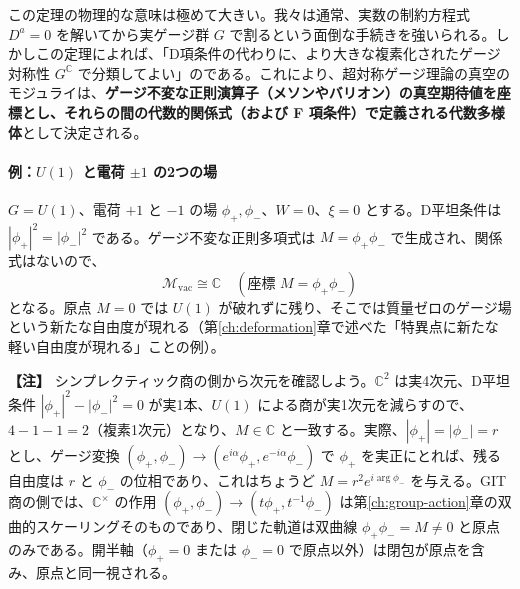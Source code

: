 \documentclass[uplatex, dvipdfmx, book]{jsbook}
\newenvironment{note}{\vspace{1ex}\par\footnotesize\noindent\textbf{【注】}}{\par\vspace{1ex}}
\begin{document}
この定理\cite{kempfness1979}の物理的な意味は極めて大きい。我々は通常、実数の制約方程式 $D^a=0$ を解いてから実ゲージ群 $G$ で割るという面倒な手続きを強いられる。しかしこの定理によれば、「D項条件の代わりに、より大きな複素化されたゲージ対称性 $G^\mathbb{C}$ で分類してよい」のである。これにより、超対称ゲージ理論の真空のモジュライは、\textbf{ゲージ不変な正則演算子（メソンやバリオン）の真空期待値を座標とし、それらの間の代数的関係式（および F 項条件）で定義される代数多様体}として決定される。

\paragraph{例：$U(1)$ と電荷 $\pm 1$ の2つの場}
$G = U(1)$、電荷 $+1$ と $-1$ の場 $\phi_+, \phi_-$、$W = 0$、$\xi = 0$ とする。D平坦条件は $|\phi_+|^2 = |\phi_-|^2$ である。ゲージ不変な正則多項式は $M = \phi_+\phi_-$ で生成され、関係式はないので、
\begin{equation}
    \mathcal{M}_{\text{vac}} \cong \mathbb{C} \quad (\text{座標 } M = \phi_+\phi_-)
\end{equation}
となる。原点 $M = 0$ では $U(1)$ が破れずに残り、そこでは質量ゼロのゲージ場という新たな自由度が現れる（第\ref{ch:deformation}章で述べた「特異点に新たな軽い自由度が現れる」ことの例）。

\begin{note}
シンプレクティック商の側から次元を確認しよう。$\mathbb{C}^2$ は実4次元、D平坦条件 $|\phi_+|^2 - |\phi_-|^2 = 0$ が実1本、$U(1)$ による商が実1次元を減らすので、$4 - 1 - 1 = 2$（複素1次元）となり、$M \in \mathbb{C}$ と一致する。実際、$|\phi_+| = |\phi_-| = r$ とし、ゲージ変換 $(\phi_+, \phi_-) \to (e^{i\alpha}\phi_+, e^{-i\alpha}\phi_-)$ で $\phi_+$ を実正にとれば、残る自由度は $r$ と $\phi_-$ の位相であり、これはちょうど $M = r^2 e^{i\arg\phi_-}$ を与える。GIT商の側では、$\mathbb{C}^\times$ の作用 $(\phi_+, \phi_-) \to (t\phi_+, t^{-1}\phi_-)$ は第\ref{ch:group-action}章の双曲的スケーリングそのものであり、閉じた軌道は双曲線 $\phi_+\phi_- = M \neq 0$ と原点のみである。開半軸（$\phi_+ = 0$ または $\phi_- = 0$ で原点以外）は閉包が原点を含み、原点と同一視される。
\end{note}
\end{document}
